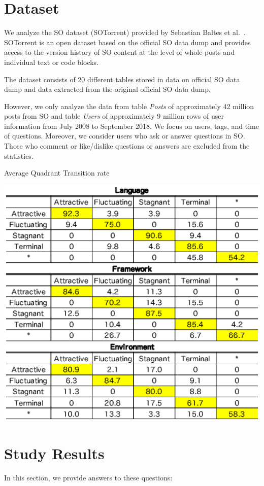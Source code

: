 \documentclass[english,preprint,JIP,technote]{ipsj}
\begin{document}
\section{Dataset}
We analyze the SO dataset (SOTorrent) provided by Sebastian Baltes et al.~\cite{msr2019challenge}. SOTorrent is an open dataset based on the official SO data dump and provides access to the version history of SO content at the level of whole posts and individual text or code blocks.

The dataset consists of 20 different tables stored in data on official SO data dump and data extracted from the original official SO data dump.

However, we only analyze the data from table \emph{Posts} of approximately 42 million posts from SO and table \emph{Users} of approximately 9 million rows of user information from July 2008 to September 2018. We focus on  users, tags, and time of questions. Moreover, we consider users who ask or answer questions in SO. Those who comment or like/dislike questions or answers are excluded from the statistics.

\begin{table}[t]
 \centering
 \caption{Average Quadrant Transition rate}
 \includegraphics[width=1.0\hsize]{img/averageAFST.eps} 
 \label{table2} 
\end{table}


\section{Study Results} %
In this section, we provide answers to these questions:
\end{document}
